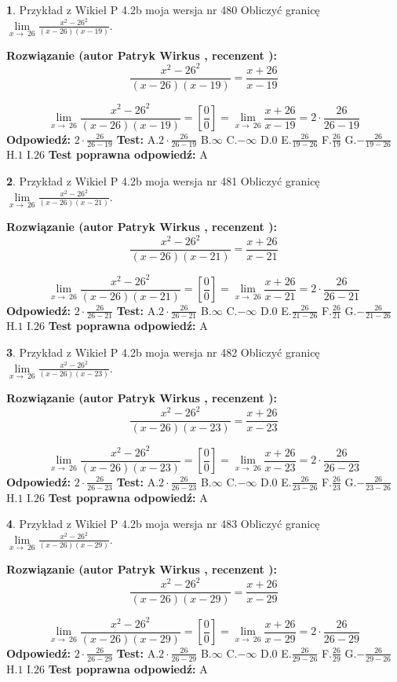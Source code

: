 \documentclass[12pt, a4paper]{article}
\theoremstyle{definition} %
\newtheorem{zad}{}
\newcommand{\zadStart}[1]{\begin{zad}#1\newline}
\newcommand{\zadStop}{\end{zad}}
\newcommand{\rozwStart}[2]{\noindent \textbf{Rozwiązanie (autor #1 , recenzent #2): }\newline}
\newcommand{\rozwStop}{\newline}
\newcommand{\odpStart}{\noindent \textbf{Odpowiedź:}\newline}
\newcommand{\odpStop}{\newline}
\newcommand{\testStart}{\noindent \textbf{Test:}\newline}
\newcommand{\testStop}{\newline}
\newcommand{\kluczStart}{\noindent \textbf{Test poprawna odpowiedź:}\newline}
\newcommand{\kluczStop}{\newline}
\begin{document}
\zadStart{Przykład z Wikieł P 4.2b moja wersja nr 480}
Obliczyć granicę $\lim\limits_{x\to\ 26}\frac{x^{2}-26^{2}}{(x-26)(x-19)}$.
\zadStop
\rozwStart{Patryk Wirkus}{}
$$\frac{x^{2}-26^{2}}{(x-26)(x-19)}=\frac{x+26}{x-19}$$

$$\lim\limits_{x\to\ 26}\frac{x^{2}-26^{2}}{(x-26)(x-19)}=[\frac{0}{0}]=\lim\limits_{x\to\ 26}\frac{x+26}{x-19}=2 \cdot \frac{26}{26-19}$$
\rozwStop
\odpStart
$2 \cdot \frac{26}{26-19}$
\odpStop
\testStart
A.$2 \cdot \frac{26}{26-19}$
B.$\infty$
C.$-\infty$
D.$0$
E.$\frac{26}{19-26}$
F.$\frac{26}{19}$
G.$-\frac{26}{19-26}$
H.$1$
I.$26$
\testStop
\kluczStart
A
\kluczStop



\zadStart{Przykład z Wikieł P 4.2b moja wersja nr 481}
Obliczyć granicę $\lim\limits_{x\to\ 26}\frac{x^{2}-26^{2}}{(x-26)(x-21)}$.
\zadStop
\rozwStart{Patryk Wirkus}{}
$$\frac{x^{2}-26^{2}}{(x-26)(x-21)}=\frac{x+26}{x-21}$$

$$\lim\limits_{x\to\ 26}\frac{x^{2}-26^{2}}{(x-26)(x-21)}=[\frac{0}{0}]=\lim\limits_{x\to\ 26}\frac{x+26}{x-21}=2 \cdot \frac{26}{26-21}$$
\rozwStop
\odpStart
$2 \cdot \frac{26}{26-21}$
\odpStop
\testStart
A.$2 \cdot \frac{26}{26-21}$
B.$\infty$
C.$-\infty$
D.$0$
E.$\frac{26}{21-26}$
F.$\frac{26}{21}$
G.$-\frac{26}{21-26}$
H.$1$
I.$26$
\testStop
\kluczStart
A
\kluczStop



\zadStart{Przykład z Wikieł P 4.2b moja wersja nr 482}
Obliczyć granicę $\lim\limits_{x\to\ 26}\frac{x^{2}-26^{2}}{(x-26)(x-23)}$.
\zadStop
\rozwStart{Patryk Wirkus}{}
$$\frac{x^{2}-26^{2}}{(x-26)(x-23)}=\frac{x+26}{x-23}$$

$$\lim\limits_{x\to\ 26}\frac{x^{2}-26^{2}}{(x-26)(x-23)}=[\frac{0}{0}]=\lim\limits_{x\to\ 26}\frac{x+26}{x-23}=2 \cdot \frac{26}{26-23}$$
\rozwStop
\odpStart
$2 \cdot \frac{26}{26-23}$
\odpStop
\testStart
A.$2 \cdot \frac{26}{26-23}$
B.$\infty$
C.$-\infty$
D.$0$
E.$\frac{26}{23-26}$
F.$\frac{26}{23}$
G.$-\frac{26}{23-26}$
H.$1$
I.$26$
\testStop
\kluczStart
A
\kluczStop



\zadStart{Przykład z Wikieł P 4.2b moja wersja nr 483}
Obliczyć granicę $\lim\limits_{x\to\ 26}\frac{x^{2}-26^{2}}{(x-26)(x-29)}$.
\zadStop
\rozwStart{Patryk Wirkus}{}
$$\frac{x^{2}-26^{2}}{(x-26)(x-29)}=\frac{x+26}{x-29}$$

$$\lim\limits_{x\to\ 26}\frac{x^{2}-26^{2}}{(x-26)(x-29)}=[\frac{0}{0}]=\lim\limits_{x\to\ 26}\frac{x+26}{x-29}=2 \cdot \frac{26}{26-29}$$
\rozwStop
\odpStart
$2 \cdot \frac{26}{26-29}$
\odpStop
\testStart
A.$2 \cdot \frac{26}{26-29}$
B.$\infty$
C.$-\infty$
D.$0$
E.$\frac{26}{29-26}$
F.$\frac{26}{29}$
G.$-\frac{26}{29-26}$
H.$1$
I.$26$
\testStop
\kluczStart
A
\kluczStop
\end{document}
